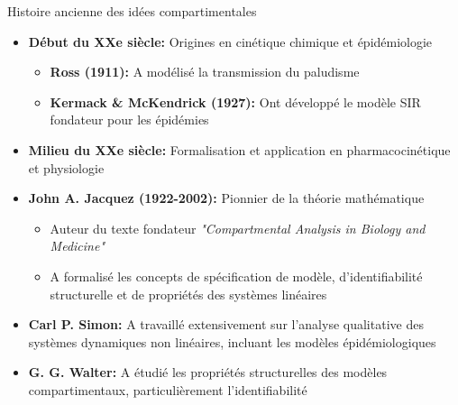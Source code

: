 \documentclass[aspectratio=169]{beamer}\usepackage[]{graphicx}\usepackage[]{xcolor}
\begin{document}
\begin{frame}{Histoire ancienne des idées compartimentales}
    \begin{itemize}
        \item \textbf{Début du XXe siècle:} Origines en cinétique chimique et épidémiologie
        \begin{itemize}
            \item \textbf{Ross (1911):} A modélisé la transmission du paludisme
            \item \textbf{Kermack \& McKendrick (1927):} Ont développé le modèle SIR fondateur pour les épidémies
        \end{itemize}
        \item \textbf{Milieu du XXe siècle:} Formalisation et application en pharmacocinétique et physiologie
        \item \textbf{John A. Jacquez (1922-2002):} Pionnier de la théorie mathématique
        \begin{itemize}
            \item Auteur du texte fondateur \textit{"Compartmental Analysis in Biology and Medicine"}
            \item A formalisé les concepts de spécification de modèle, d'identifiabilité structurelle et de propriétés des systèmes linéaires
        \end{itemize}
        \item \textbf{Carl P. Simon:} A travaillé extensivement sur l'analyse qualitative des systèmes dynamiques non linéaires, incluant les modèles épidémiologiques
        \item \textbf{G. G. Walter:} A étudié les propriétés structurelles des modèles compartimentaux, particulièrement l'identifiabilité
    \end{itemize}
\end{frame}
\end{document}
